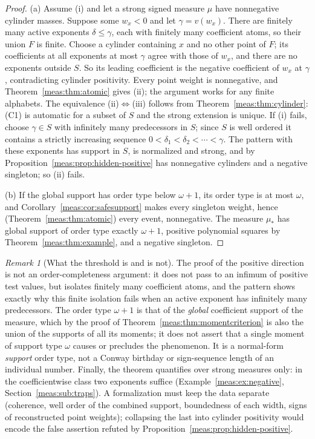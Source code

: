 \documentclass[11pt]{article}
\numberwithin{equation}{section}
\theoremstyle{definition}
\theoremstyle{remark}
\newtheorem{remark}[theorem]{Remark}
\begin{document}
\begin{proof}
(a) Assume (i) and let a strong signed measure $\mu$ have nonnegative cylinder
masses. Suppose some $w_x<0$ and let $\gamma=v(w_x)$. There are finitely many
active exponents $\delta\le\gamma$, each with finitely many coefficient atoms, so
their union $F$ is finite. Choose a cylinder containing $x$ and no other point
of $F$; its coefficients at all exponents at most $\gamma$ agree with those of
$w_x$, and there are no exponents outside $S$. So its leading coefficient is the
negative coefficient of $w_x$ at $\gamma$, contradicting cylinder positivity.
Every point weight is nonnegative, and Theorem~\ref{meas:thm:atomic} gives (ii);
the argument works for any finite alphabets. The equivalence
(ii)$\Leftrightarrow$(iii) follows from Theorem~\ref{meas:thm:cylinder}: (C1) is
automatic for a subset of $S$ and the strong extension is unique. If (i) fails,
choose $\gamma\in S$ with infinitely many predecessors in $S$; since $S$ is well
ordered it contains a strictly increasing sequence
$0<\delta_1<\delta_2<\cdots<\gamma$. The pattern with these exponents has support in
$S$, is normalized and strong, and by
Proposition~\ref{meas:prop:hidden-positive} has nonnegative cylinders and a
negative singleton; so (ii) fails.

(b) If the global support has order type below $\omega+1$, its order type is at
most $\omega$, and Corollary~\ref{meas:cor:safesupport} makes every singleton
weight, hence (Theorem~\ref{meas:thm:atomic}) every event, nonnegative. The
measure $\mu_*$ has global support of order type exactly $\omega+1$, positive
polynomial squares by Theorem~\ref{meas:thm:example}, and a negative singleton.
\end{proof}

\begin{remark}[What the threshold is and is not]\label{meas:rem:threshold-scope}
The proof of the positive direction is not an order-completeness argument: it
does not pass to an infimum of positive test values, but isolates finitely many
coefficient atoms, and the pattern shows exactly why this finite isolation fails
when an active exponent has infinitely many predecessors. The order type
$\omega+1$ is that of the \emph{global} coefficient support of the measure, which
by the proof of Theorem~\ref{meas:thm:momentcriterion} is also the union of the
supports of all its moments; it does not assert that a single moment of support
type $\omega$ causes or precludes the phenomenon. It is a normal-form
\emph{support} order type, not a Conway birthday or sign-sequence length of an
individual number. Finally, the theorem quantifies over strong measures only:
in the coefficientwise class two exponents suffice
(Example~\ref{meas:ex:negative}, Section~\ref{meas:sub:traps}). A formalization
must keep the data separate (coherence, well order of the combined support,
boundedness of each width, signs of reconstructed point weights); collapsing
the last into cylinder positivity would encode the false assertion refuted by
Proposition~\ref{meas:prop:hidden-positive}.
\end{remark}
\end{document}
